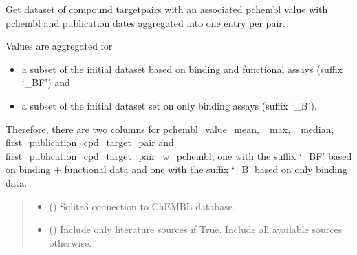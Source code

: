 \documentclass[letterpaper,10pt,english]{sphinxmanual}
\begin{document}
\begin{fulllineitems}
\label{\detokenize{get_activity_ct_pairs:get_activity_ct_pairs.get_aggregated_activity_ct_pairs}}
\pysigstartsignatures
{}
\pysigstopsignatures
\sphinxAtStartPar
Get dataset of compound target\sphinxhyphen{}pairs with an associated pchembl value
with pchembl and publication dates aggregated into one entry per pair.

\sphinxAtStartPar
Values are aggregated for
\begin{itemize}
\item {} 
\sphinxAtStartPar
a subset of the initial dataset based on binding and functional assays (suffix ‘\_BF’) and

\item {} 
\sphinxAtStartPar
a subset of the initial dataset set on only binding assays (suffix ‘\_B’).

\end{itemize}

\sphinxAtStartPar
Therefore, there are two columns for pchembl\_value\_mean, \_max, \_median, first\_publication\_cpd\_target\_pair and first\_publication\_cpd\_target\_pair\_w\_pchembl,
one with the suffix ‘\_BF’ based on binding + functional data and one with the suffix ‘\_B’ based on only binding data.
\begin{quote}\begin{description}
\begin{itemize}
\item {} 
\sphinxAtStartPar
{} () \textendash{} Sqlite3 connection to ChEMBL database.

\item {} 
\sphinxAtStartPar
{} () \textendash{} Include only literature sources if True. Include all available sources otherwise.


\end{itemize}
\end{description}
\end{quote}
\end{fulllineitems}
\end{document}
